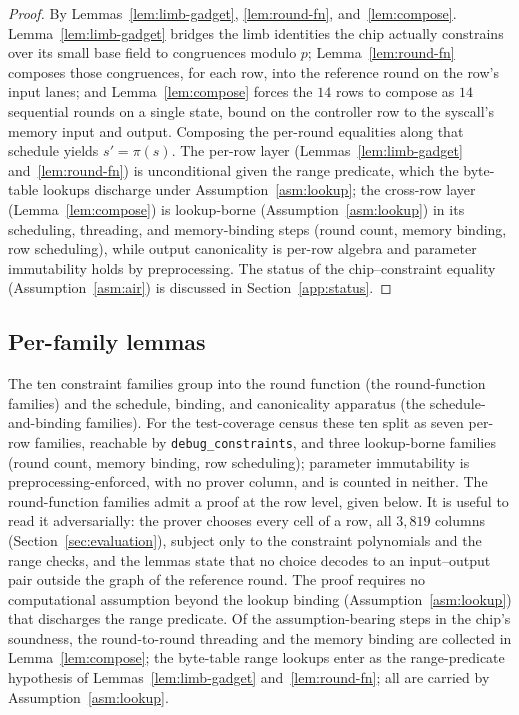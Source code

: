\begin{proof}
By Lemmas~\ref{lem:limb-gadget}, \ref{lem:round-fn}, and~\ref{lem:compose}. Lemma~\ref{lem:limb-gadget} bridges the limb identities the chip actually constrains over its small base field to congruences modulo $p$; Lemma~\ref{lem:round-fn} composes those congruences, for each row, into the reference round on the row's input lanes; and Lemma~\ref{lem:compose} forces the $14$ rows to compose as $14$ sequential rounds on a single state, bound on the controller row to the syscall's memory input and output. Composing the per-round equalities along that schedule yields $s'=\pi(s)$. The per-row layer (Lemmas~\ref{lem:limb-gadget} and~\ref{lem:round-fn}) is unconditional given the range predicate, which the byte-table lookups discharge under Assumption~\ref{asm:lookup}; the cross-row layer (Lemma~\ref{lem:compose}) is lookup-borne (Assumption~\ref{asm:lookup}) in its scheduling, threading, and memory-binding steps (round count, memory binding, row scheduling), while output canonicality is per-row algebra and parameter immutability holds by preprocessing. The status of the chip--constraint equality (Assumption~\ref{asm:air}) is discussed in Section~\ref{app:status}.
\end{proof}

\subsection{Per-family lemmas}\label{app:air-families}
The ten constraint families group into the round function (the round-function families) and the schedule, binding, and canonicality apparatus (the schedule-and-binding families). For the test-coverage census these ten split as seven per-row families, reachable by \texttt{debug\_constraints}, and three lookup-borne families (round count, memory binding, row scheduling); parameter immutability is preprocessing-enforced, with no prover column, and is counted in neither. The round-function families admit a proof at the row level, given below. It is useful to read it adversarially: the prover chooses every cell of a row, all $3{,}819$ columns (Section~\ref{sec:evaluation}), subject only to the constraint polynomials and the range checks, and the lemmas state that no choice decodes to an input--output pair outside the graph of the reference round. The proof requires no computational assumption beyond the lookup binding (Assumption~\ref{asm:lookup}) that discharges the range predicate. Of the assumption-bearing steps in the chip's soundness, the round-to-round threading and the memory binding are collected in Lemma~\ref{lem:compose}; the byte-table range lookups enter as the range-predicate hypothesis of Lemmas~\ref{lem:limb-gadget} and~\ref{lem:round-fn}; all are carried by Assumption~\ref{asm:lookup}.

